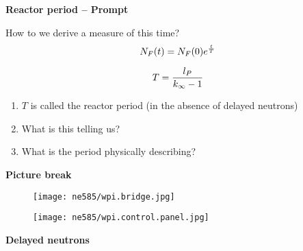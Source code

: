 \documentclass[aspectratio=1610,pdftex,dvipsnames,compress,xcolor={dvipsnames}]{beamer}
\begin{document}
\begin{frame}[plain]{}
    \centering\LARGE\textbf{Reactor period -- Prompt}
\end{frame}


\addtocounter{framenumber}{-1} 
\begin{frame}{How to we derive a measure of this time?}
    \begin{equation}
        \LARGE
        N_F(t)=N_F(0)e^{\frac{t}{T}}
    \end{equation}

    \begin{equation}
        \LARGE
        T = \frac{l_P}{k_\infty - 1}
    \end{equation}

    \vspace*{\fill}

    \begin{enumerate}[series=outerlist,topsep=0pt,itemsep=21pt,leftmargin=*,label=(\arabic*)]
        \item[]$T$ is called the reactor period (in the absence of delayed neutrons)
        \item[]What is this telling us?
        \item[]What is the period physically describing?
    \end{enumerate}
\end{frame}


\begin{frame}[plain]{}
    \centering\LARGE\textbf{Picture break}
\end{frame}


\addtocounter{framenumber}{-1} 
\begin{frame}{}
    \begin{figure}
        \centering
        \texttt{[image: ne585/wpi.bridge.jpg]}
    \end{figure}
\end{frame}


\begin{frame}{}
    \begin{figure}
        \centering
        \texttt{[image: ne585/wpi.control.panel.jpg]}
    \end{figure}
\end{frame}


\begin{frame}[plain]{}
    \centering\LARGE\textbf{Delayed neutrons}
\end{frame}
\end{document}
